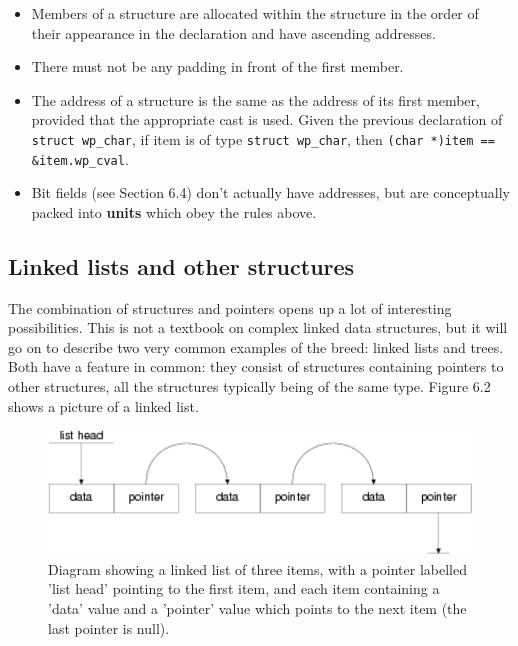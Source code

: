    \begin{itemize}
    \item Members of a structure are allocated within the structure in the
     order of their appearance in the declaration and have ascending
     addresses.

    \item There must not be any padding in front of the first member.

    \item The address of a structure is the same as the address of its first
     member, provided that the appropriate cast is used. Given the
     previous declaration of \texttt{struct wp\_char}, if item is of type
     \texttt{struct wp\_char}, then
     \texttt{(char *)item == \&item.wp\_cval}.

    \item Bit fields (see Section 6.4) don't actually have
     addresses, but are conceptually packed into \textbf{units} which obey
     the rules above.
   \end{itemize}

  

  \subsection{Linked lists and other structures}
   

   The combination of structures and pointers opens up a lot of interesting
    possibilities. This is not a textbook on complex linked data structures,
    but it will go on to describe two very common examples of the breed: linked
    lists and trees. Both have a feature in common: they consist of structures
    containing pointers to other structures, all the structures typically being
    of the same type. Figure 6.2 shows a picture of a linked
    list.


   \begin{figure}\centering\includegraphics[type=pdf,read=.pdf,ext=.pdf,scale=1.0]{figure/6.2}\caption{Diagram showing a linked list of three items, with a pointer            labelled 'list head' pointing to the first item, and each item            containing a 'data' value and a 'pointer' value which points to            the next item (the last pointer is null).}\end{figure}

